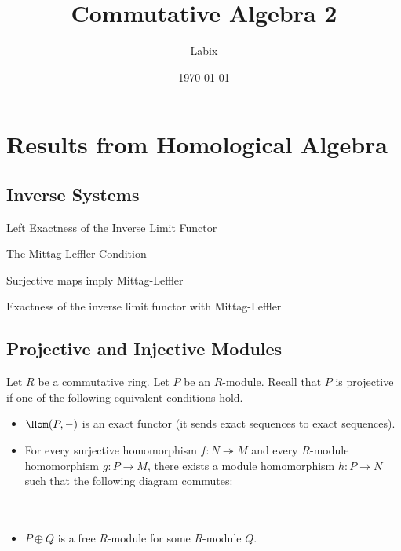 \documentclass[a4paper]{article}
\title{Commutative Algebra 2}
\author{Labix}
\date{\today}
\begin{document}
\maketitle
\begin{abstract}
\end{abstract}
\pagebreak
\tableofcontents

\pagebreak
\section{Results from Homological Algebra}
\subsection{Inverse Systems}
\begin{prp}{}{} Left Exactness of the Inverse Limit Functor
\end{prp}

\begin{defn}{The Mittag-Leffler Condition}{}
\end{defn}

\begin{lmm}{}{} Surjective maps imply Mittag-Leffler
\end{lmm}

\begin{prp}{}{} Exactness of the inverse limit functor with Mittag-Leffler
\end{prp}

\subsection{Projective and Injective Modules}
Let $R$ be a commutative ring. Let $P$ be an $R$-module. Recall that $P$ is projective if one of the following equivalent conditions hold. 
\begin{itemize}
\item $\Hom(P,-)$ is an exact functor (it sends exact sequences to exact sequences). 
\item For every surjective homomorphism $f:N\twoheadrightarrow M$ and every $R$-module homomorphism $g:P\to M$, there exists a module homomorphism $h:P\to N$ such that the following diagram commutes: \\~\\
 \\
\item $P\oplus Q$ is a free $R$-module for some $R$-module $Q$. 
\end{itemize}
\end{document}
